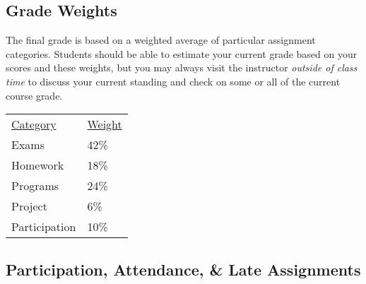 \documentclass[10pt]{article}
\begin{document}
\subsection{Grade Weights}

The final grade is based on a weighted average of particular assignment categories.  Students should be able to estimate your current grade based on your scores and these weights, but you may always visit the instructor \textit{outside of class time} to discuss your current standing and check on some or all of the current course grade.

\begin{center}
  \begin{tabular}{ll}
  \underline{Category} & \underline{Weight} \\
    Exams & 42\% \\ %
    Homework & 18\% \\ %
    Programs & 24\% \\ %
    Project & 6\% \\ %
    Participation & 10\%
  \end{tabular}
\end{center}

\subsection{Participation, Attendance, \& Late Assignments}


\end{document}
